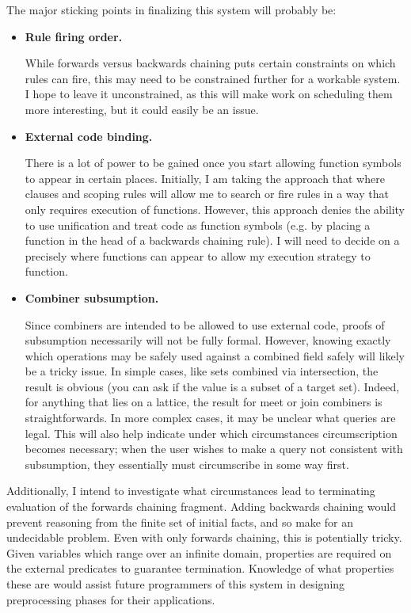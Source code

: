 The major sticking points in finalizing this system will probably be:
\begin{itemize}
\item {\bf Rule firing order.}

While forwards versus backwards chaining puts certain constraints on which rules can fire, this may need to be constrained further for a workable system.
I hope to leave it unconstrained, as this will make work on scheduling them more interesting, but it could easily be an issue.

\item {\bf External code binding.}

There is a lot of power to be gained once you start allowing function symbols to appear in certain places.
Initially, I am taking the approach that where clauses and scoping rules will allow me to search or fire rules in a way that only requires execution of functions.
However, this approach denies the ability to use unification and treat code as function symbols (e.g. by placing a function in the head of a backwards chaining rule).
I will need to decide on a precisely where functions can appear to allow my execution strategy to function.

\item {\bf Combiner subsumption.}

Since combiners are intended to be allowed to use external code, proofs of subsumption necessarily will not be fully formal.
However, knowing exactly which operations may be safely used against a combined field safely will likely be a tricky issue.
In simple cases, like sets combined via intersection, the result is obvious (you can ask if the value is a subset of a target set).
Indeed, for anything that lies on a lattice, the result for meet or join combiners is straightforwards.
In more complex cases, it may be unclear what queries are legal.
This will also help indicate under which circumstances circumscription becomes necessary;
when the user wishes to make a query not consistent with subsumption, they essentially must circumscribe in some way first.
\end{itemize}

Additionally, I intend to investigate what circumstances lead to terminating evaluation of the forwards chaining fragment.
Adding backwards chaining would prevent reasoning from the finite set of initial facts, and so make for an undecidable problem.
Even with only forwards chaining, this is potentially tricky.
Given variables which range over an infinite domain, properties are required on the external predicates to guarantee termination.
Knowledge of what properties these are would assist future programmers of this system in designing preprocessing phases for their applications.

